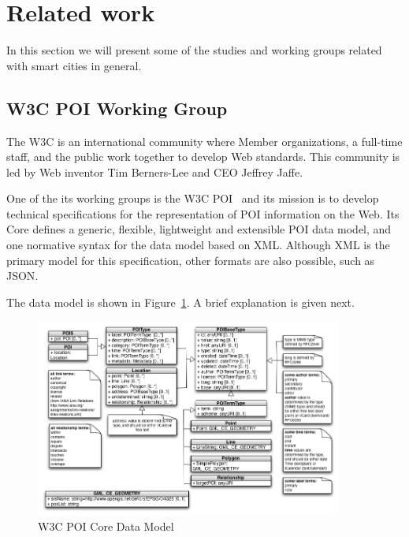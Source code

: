 \documentclass[times]{ettauth}
\begin{document}
\section{Related work}
\label{s:related-work}
In this section we will present some of the studies and working groups related with smart cities in general.  

\subsection{\acf{W3C} \acf{POI} Working Group}
\label{section:poi-wg}
The \ac{W3C} is an international community where Member organizations, a full-time staff, and the public work together to develop Web standards. This community is led by Web inventor Tim Berners-Lee and CEO Jeffrey Jaffe. 

One of the its working groups is the \ac{W3C} POI~\cite{w3c-poi} and its mission is to develop technical specifications for the representation of \ac{POI} information on the Web. Its Core defines a generic, flexible, lightweight and extensible \ac{POI} data model, and one normative syntax for the data model based on \acf{XML}. Although \ac{XML} is the primary model for this specification, other formats are also possible, such as \acf{JSON}.

The data model is shown in Figure~\ref{fig:data-model}. A brief explanation is given next.

\begin{figure}
\centering
\includegraphics[width=0.9\textwidth]{images/uml}
\caption{W3C POI Core Data Model}
\label{fig:data-model}
\end{figure}
\end{document}
